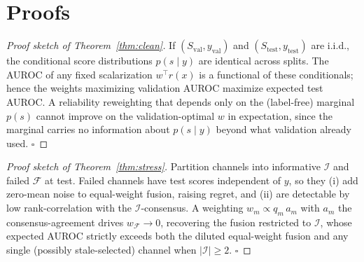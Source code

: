 \documentclass[11pt]{article}
\begin{document}
\appendix
\section{Proofs}\label{sec:proofs}
\begin{proof}[Proof sketch of Theorem~\ref{thm:clean}]
If $(S_{\text{val}},y_{\text{val}})$ and $(S_{\text{test}},y_{\text{test}})$ are i.i.d.,
the conditional score distributions $p(s\mid y)$ are identical across splits. The AUROC
of any fixed scalarization $w^\top r(x)$ is a functional of these conditionals; hence the
weights maximizing validation AUROC maximize expected test AUROC. A reliability
reweighting that depends only on the (label-free) marginal $p(s)$ cannot improve on the
validation-optimal $w$ in expectation, since the marginal carries no information about
$p(s\mid y)$ beyond what validation already used. $\square$
\end{proof}
\begin{proof}[Proof sketch of Theorem~\ref{thm:stress}]
Partition channels into informative $\mathcal{I}$ and failed $\mathcal{F}$ at test.
Failed channels have test scores independent of $y$, so they (i) add zero-mean noise to
equal-weight fusion, raising regret, and (ii) are detectable by low rank-correlation with
the $\mathcal{I}$-consensus. A weighting $w_m \propto q_m\,a_m$ with $a_m$ the
consensus-agreement drives $w_{\mathcal{F}}\to 0$, recovering the fusion restricted to
$\mathcal{I}$, whose expected AUROC strictly exceeds both the diluted equal-weight fusion
and any single (possibly stale-selected) channel when $|\mathcal{I}|\ge 2$. $\square$
\end{proof}
\end{document}
